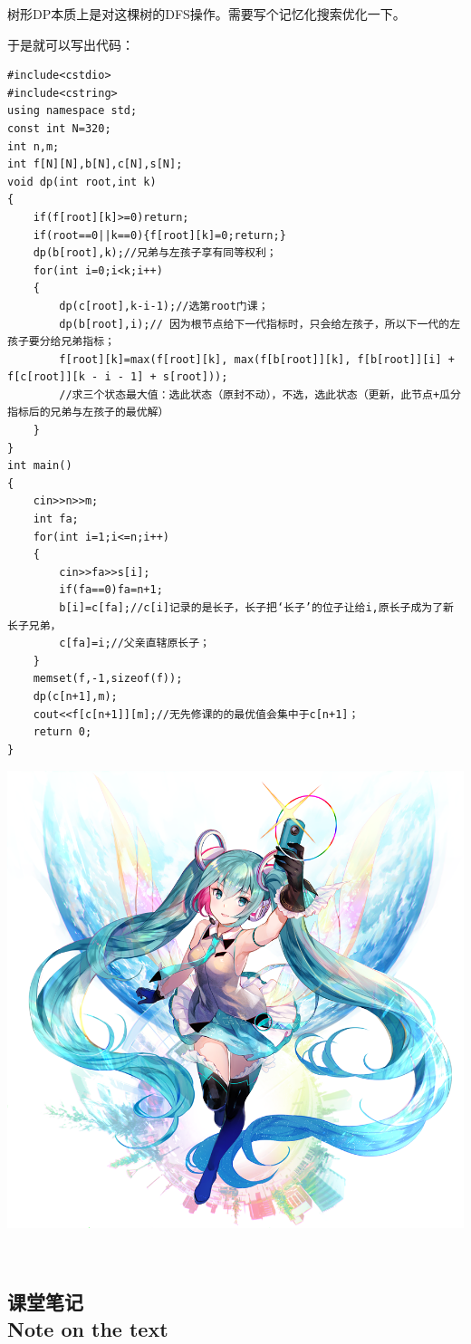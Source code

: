 \documentclass{article}
\theoremstyle{nonumberplain}
\newcommand{\note}{\ \par


	\subsection*{课堂笔记\\\tiny{Note on the text}}
	\newpage}
\begin{document}
树形DP本质上是对这棵树的DFS操作。需要写个记忆化搜索优化一下。

于是就可以写出代码：

\begin{verbatim}
#include<cstdio>
#include<cstring>
using namespace std;
const int N=320;
int n,m;
int f[N][N],b[N],c[N],s[N];
void dp(int root,int k)
{
    if(f[root][k]>=0)return;
    if(root==0||k==0){f[root][k]=0;return;}
    dp(b[root],k);//兄弟与左孩子享有同等权利；
    for(int i=0;i<k;i++)
    {
        dp(c[root],k-i-1);//选第root门课； 
        dp(b[root],i);// 因为根节点给下一代指标时，只会给左孩子，所以下一代的左孩子要分给兄弟指标；
        f[root][k]=max(f[root][k], max(f[b[root]][k], f[b[root]][i] + f[c[root]][k - i - 1] + s[root]));
        //求三个状态最大值：选此状态（原封不动），不选，选此状态（更新，此节点+瓜分指标后的兄弟与左孩子的最优解） 
    }
}
int main()
{
    cin>>n>>m;
    int fa;
    for(int i=1;i<=n;i++)
    {
        cin>>fa>>s[i];
        if(fa==0)fa=n+1; 
        b[i]=c[fa];//c[i]记录的是长子，长子把‘长子’的位子让给i,原长子成为了新长子兄弟， 
        c[fa]=i;//父亲直辖原长子； 
    }
    memset(f,-1,sizeof(f));
    dp(c[n+1],m);
    cout<<f[c[n+1]][m];//无先修课的的最优值会集中于c[n+1]； 
    return 0;
}
\end{verbatim}
\begin{center}\includegraphics[scale=1.75]{64304330_p0.png}\end{center}
\note
\end{document}
